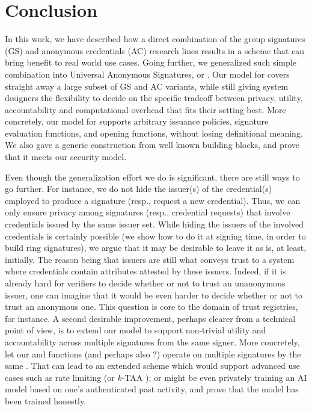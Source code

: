 \section{Conclusion}
\label{sec:conclusion}

In this work, we have described how a direct combination of the group signatures
(GS) and anonymous credentials (AC) research lines results in a scheme that can
bring benefit to real world use cases. Going further, we generalized such simple
combination into Universal Anonymous Signatures, or \UAS. Our model for \UAS
covers straight away a large subset of GS and AC variants, while still giving
system designers the flexibility to decide on the specific tradeoff between
privacy, utility, accountability and computational overhead that fits their
setting best. More concretely, our model for \UAS supports arbitrary issuance
policies, signature evaluation functions, and opening functions, without losing
definitional meaning. We also gave a generic construction from well known
building blocks, and prove that it meets our security model.

Even though the generalization effort we do is significant, there are still
ways to go further.
%
For instance, we do not hide the issuer(s) of the
credential(s) employed to produce a signature (resp., request a new credential).
Thus, we can only ensure privacy among signatures (resp., credential requests)
that involve credentials issued by the same issuer set. While hiding the issuers
of the involved credentials is certainly possible (we show how to do it at
signing time, in order to build ring signatures), we argue that it may be
desirable to leave it as is, at least, initially. The reason being that issuers
are still what conveys trust to a system where credentials contain attributes
attested by these issuers. Indeed, if it is already hard for verifiers to decide
whether or not to trust an unanonymous issuer, one can imagine that it would be
even harder to decide whether or not to trust an anonymous one. This question
is core to the domain of trust registries, for instance.
%
A second desirable improvement, perhaps clearer from a technical point of view,
is to extend our model to support non-trivial utility and accountability across
multiple signatures from the same signer. More concretely, let our \feval and
\finsp functions (and perhaps also \fissue?) operate on multiple signatures by
the same \usk. That can lead to an extended \UAS scheme which would support
advanced use cases such as rate limiting (or $k$-TAA \cite{asm06}); or might
be even privately training an AI model based on one's authenticated
past activity, and prove that the model has been trained honestly.

